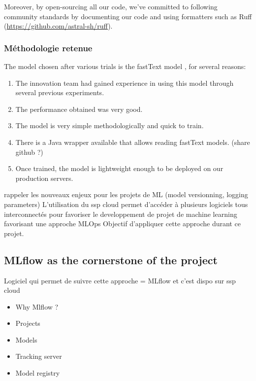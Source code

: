 Moreover, by open-sourcing all our code, we've committed to following community standards by documenting our code and using formatters such as Ruff (\url{https://github.com/astral-sh/ruff}).


\subsubsection{Méthodologie retenue}

The model chosen after various trials is the fastText model \cite{joulin2016bag}, for several reasons:

\begin{enumerate}
    \item The innovation team had gained experience in using this model through several previous experiments.
    \item The performance obtained was very good.
    \item The model is very simple methodologically and quick to train.
    \item There is a Java wrapper available that allows reading fastText models. (share github ?)
    \item Once trained, the model is lightweight enough to be deployed on our production servers.
\end{enumerate}


rappeler les nouveaux enjeux pour les projets de ML (model versionning, logging parameters) 
L'utilisation du ssp cloud permet d'accéder à plusieurs logiciels tous interconnectés pour favoriser le developpement de projet de machine learning favorisant une approche MLOps
Objectif d'appliquer cette approche durant ce projet.

\subsection{MLflow as the cornerstone of the project}

Logiciel qui permet de suivre cette approche = MLflow et c'est dispo sur ssp cloud

\begin{itemize}
    \item Why Mlflow ?
    \item Projects
    \item Models
    \item Tracking server
    \item Model registry
\end{itemize}

